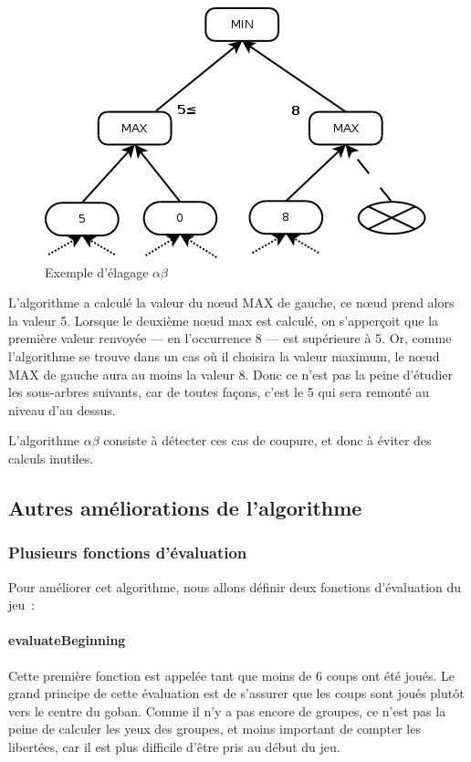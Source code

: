 \documentclass[11pt,a4paper,titlepage,french]{article}
\begin{document}
				\begin{figure}[hbt]
					\begin{center}
						\includegraphics[width=\textwidth]{./alphabeta.png}
					\end{center}
					\caption{Exemple d'élagage $\alpha\beta$}
					\label{abex}
				\end{figure}

				L'algorithme a calculé la valeur du nœud MAX de gauche, ce nœud prend alors la valeur 5. Lorsque le deuxième nœud max est calculé, on s'apperçoit que la première valeur renvoyée --- en l'occurrence 8 --- est supérieure à 5. Or, comme l'algorithme se trouve dans un cas où il choisira la valeur maximum, le nœud MAX de gauche aura au moins la valeur 8. Donc ce n'est pas la peine d'étudier les sous-arbres suivants, car de toutes façons, c'est le 5 qui sera remonté au niveau d'au dessus.

				L'algorithme $\alpha\beta$ consiste à détecter ces cas de coupure, et donc à éviter des calculs inutiles.


		\subsection{Autres améliorations de l'algorithme}

			\subsubsection{Plusieurs fonctions d'évaluation}
				Pour améliorer cet algorithme, nous allons définir deux fonctions d'évaluation du jeu~:

				\paragraph{evaluateBeginning}
					Cette première fonction est appelée tant que moins de 6 coups ont été joués. Le grand principe de cette évaluation est de s'assurer que les coups sont joués plutôt vers le centre du goban. Comme il n'y a pas encore de groupes, ce n'est pas la peine de calculer les yeux des groupes, et moins important de compter les libertées, car il est plus difficile d'être pris au début du jeu.
\end{document}
